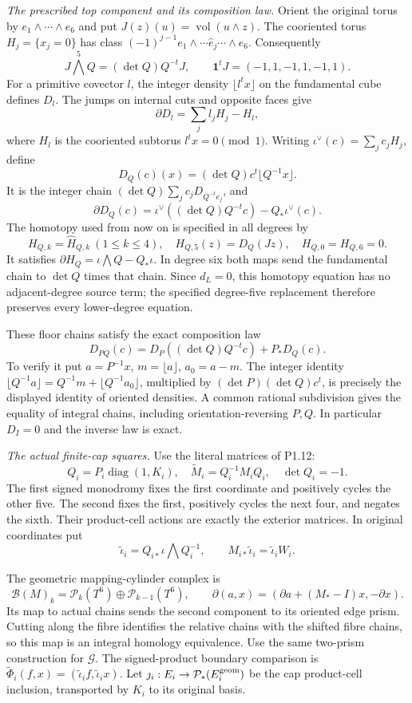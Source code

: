 \item \emph{The prescribed top component and its composition law.}
Orient the original torus by $e_1\wedge\cdots\wedge e_6$ and put
$J(z)(u)=\operatorname{vol}(u\wedge z)$. The cooriented torus
$H_j=\{x_j=0\}$ has class
$(-1)^{j-1}e_1\wedge\cdots\widehat e_j\cdots\wedge e_6$.
Consequently
\[
 J\bigwedge^5Q=(\det Q)Q^{-t}J,\qquad
 \mathbf1^tJ=(-1,1,-1,1,-1,1).
\]
For a primitive covector $l$, the integer density
$\lfloor l^tx\rfloor$ on the fundamental cube defines $D_l$.
The jumps on internal cuts and opposite faces give
\[
 \partial D_l=\sum_jl_jH_j-H_l,
\]
where $H_l$ is the cooriented subtorus $l^tx=0\pmod1$.
Writing $\iota^\vee(c)=\sum_jc_jH_j$, define
\[
 D_Q(c)(x)=(\det Q)c^t\lfloor Q^{-1}x\rfloor.
\]
It is the integer chain $(\det Q)\sum_jc_jD_{Q^{-t}e_j}$, and
\[
 \partial D_Q(c)=\iota^\vee((\det Q)Q^{-t}c)
                         -Q_*\iota^\vee(c).
\]
The homotopy used from now on is specified in all degrees by
\[
 H_{Q,k}=\widehat H_{Q,k}\ (1\leq k\leq4),\quad
 H_{Q,5}(z)=D_Q(Jz),\quad H_{Q,0}=H_{Q,6}=0.
\]
It satisfies $\partial H_Q=\iota\bigwedge Q-Q_*\iota$.
In degree six both maps send the fundamental chain to $\det Q$
times that chain. Since $d_L=0$, this homotopy equation has no
adjacent-degree source term; the specified degree-five replacement
therefore preserves every lower-degree equation.

These floor chains satisfy the exact composition law
\[
 D_{PQ}(c)=D_P((\det Q)Q^{-t}c)+P_*D_Q(c).
\]
To verify it put $a=P^{-1}x$, $m=\lfloor a\rfloor$, $a_0=a-m$.
The integer identity
$\lfloor Q^{-1}a\rfloor=Q^{-1}m+\lfloor Q^{-1}a_0\rfloor$,
multiplied by $(\det P)(\det Q)c^t$, is precisely the displayed
identity of oriented densities. A common rational subdivision gives
the equality of integral chains, including orientation-reversing
$P,Q$. In particular $D_I=0$ and the inverse law is exact.

\item \emph{The actual finite-cap squares.}
Use the literal matrices of P1.12:
\[
 Q_i=P_i\operatorname{diag}(1,K_i),\quad
 \widetilde M_i=Q_i^{-1}M_iQ_i,\quad \det Q_i=-1.
\]
The first signed monodromy fixes the first coordinate and positively
cycles the other five. The second fixes the first, positively cycles
the next four, and negates the sixth. Their product-cell actions
are exactly the exterior matrices. In original coordinates put
\[
 \widetilde\iota_i=Q_{i*}\iota\bigwedge Q_i^{-1},\qquad
 M_{i*}\widetilde\iota_i=\widetilde\iota_iW_i.
\]

The geometric mapping-cylinder complex is
\[
 \mathcal B(M)_k=\mathcal P_k(T^6)\oplus\mathcal P_{k-1}(T^6),
 \qquad
 \partial(a,x)=(\partial a+(M_*-I)x,-\partial x).
\]
Its map to actual chains sends the second component to its oriented
edge prism. Cutting along the fibre identifies the relative chains
with the shifted fibre chains, so this map is an integral homology
equivalence. Use the same two-prism construction for $\mathcal G$.
The signed-product boundary comparison is
$\widetilde\Phi_i(f,x)=(\widetilde\iota_if,\widetilde\iota_ix)$.
Let $\jmath_i:E_i\to\mathcal P_*(E_i^{\rm geom})$ be the cap
product-cell inclusion, transported by $K_i$ to its original basis.

